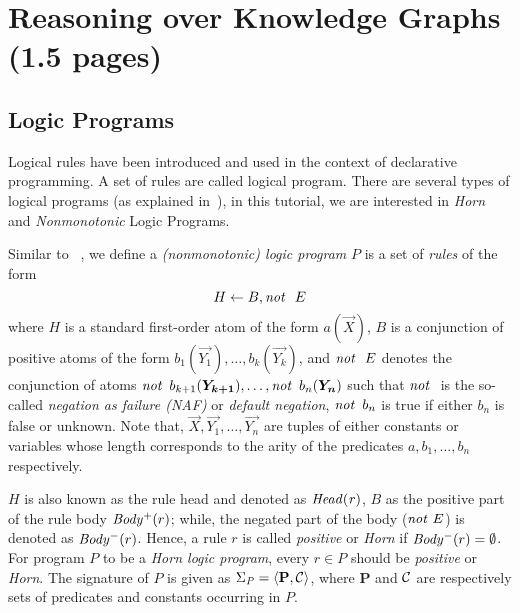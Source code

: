 \section{Reasoning over Knowledge Graphs (1.5 pages)}
\label{sec:reasoning}

\subsection{Logic Programs} Logical rules have been introduced and used in the context of declarative programming. A set of rules are called logical program. There are several types of logical programs (as explained in~\cite{DBLP:books/sp/Lloyd87}), in this tutorial, we are interested in \textit{Horn} and \textit{Nonmonotonic} Logic Programs.

Similar to ~\cite{DBLP:books/sp/Lloyd87}, we define a \emph{(nonmonotonic) logic program} $P$ is a set of \emph{rules} of the form
\begin{equation}
H\leftarrow B, \mathit{not}~ \ E
\end{equation}
 where $H$ is a standard first-order atom of the form $a(\vec{X})$, $B$ is a conjunction of positive atoms of the form $b_1(\vec{Y_1}),\dotsc,b_k(\vec{Y_k})$, and $\mathit{not}~ \ E$ %
 denotes the conjunction of atoms $\naf\, b_{k+1}(\vec{Y_{k+1}}),\dotsc,\naf\, b_n(\vec{Y_{n}})$ such that $\naf$ is the so-called \emph{negation as failure (NAF)} or \emph{default negation}, \ie $\mathit{not}~ \, b_n$ is true if either $b_n$ is false or unknown. Note that, $\vec{X},\vec{Y_1},\ldots,\vec{Y_{n}}$ are tuples of either constants or variables whose length corresponds to the arity of the predicates $a,b_1,\ldots,b_n$ respectively.
 
$H$ is also known as the rule head and denoted as $\mathit{Head(r)}$, $B$ as the positive part of the rule body $\mathit{Body^+}(r)$; while, the negated part of the body ($\mathit{not}~ E$) is denoted as $\mathit{Body^-}(r)$. Hence, a rule $r$ is called \emph{positive} or
\emph{Horn} if $\mathit{Body^-}(r)=\emptyset$. For program $P$ to be a \textit{Horn logic program}, every $r \in P$ should be \emph{positive} or \emph{Horn}. 
  The signature of $P$ is given as $\Sigma_{\mathit{P}}=\langle\mathbf{P},\mathcal{C}\rangle$, where $\mathbf{P}$ and $\mathcal{C}$ are respectively sets of predicates and constants occurring in $P$. 

